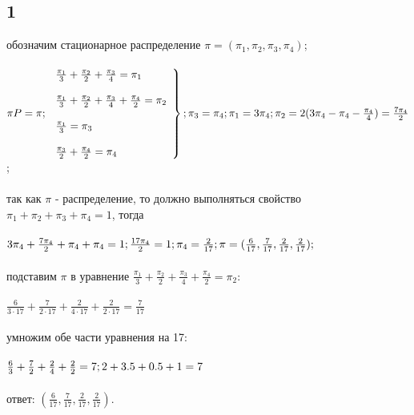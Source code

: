 \documentclass[a4paper]{article}
\begin{document}
\begin{large}
	\subsection*{1}
	обозначим стационарное распределение $\pi=(\pi_1,\pi_2,\pi_3,\pi_4)$;\\\\
	$
	\pi P=\pi;\\\\
	\left.
	\begin{array}{ll}
		\frac{\pi_1}{3}+\frac{\pi_2}{2}+\frac{\pi_3}{4}=\pi_1\\\\
		\frac{\pi_1}{3}+\frac{\pi_2}{2}+\frac{\pi_3}{4}+\frac{\pi_4}{2}=\pi_2\\\\
		\frac{\pi_1}{3}=\pi_3\\\\
		\frac{\pi_3}{2}+\frac{\pi_4}{2}=\pi_4
	\end{array}
	\right\};\\\\
	\pi_3=\pi_4;\\
	\pi_1=3\pi_4;\\
	\pi_2=2(3\pi_4-\pi_4-\frac{\pi_4}{4})=\frac{7\pi_4}{2}
	$;\\\\
	так как $\pi$ - распределение, то должно выполняться свойство $\pi_1+\pi_2+\pi_3+\pi_4=1$, тогда\\\\
	$
	3\pi_4+\frac{7\pi_4}{2}+\pi_4+\pi_4=1;\\\\
	\frac{17\pi_4}{2}=1;\\\\
	\pi_4=\frac{2}{17};\\\\
	\pi=(\frac{6}{17},\frac{7}{17},\frac{2}{17},\frac{2}{17});
	$\\\\
	подставим $\pi$ в уравнение $\frac{\pi_1}{3}+\frac{\pi_2}{2}+\frac{\pi_3}{4}+\frac{\pi_4}{2}=\pi_2$:\\\\
	$\frac{6}{3\cdot17}+\frac{7}{2\cdot17}+\frac{2}{4\cdot17}+\frac{2}{2\cdot17}=\frac{7}{17}$\\\\
	умножим обе части уравнения на 17:\\\\
	$
	\frac{6}{3}+\frac{7}{2}+\frac{2}{4}+\frac{2}{2}=7;\\\\
	2+3.5+0.5+1=7
	$\\\\
	ответ: $(\frac{6}{17},\frac{7}{17},\frac{2}{17},\frac{2}{17})$.

\end{large}
\end{document}
